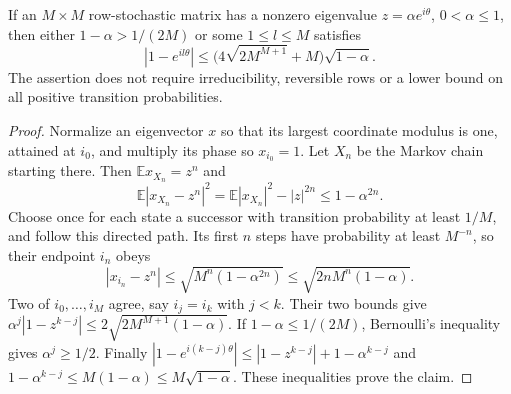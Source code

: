 \begin{lemma}\label{lem:r68-cycle}
If an $M\times M$ row-stochastic matrix has a nonzero eigenvalue $z=\alpha e^{i\theta}$, $0<\alpha\le1$, then either $1-\alpha>1/(2M)$ or some $1\le l\le M$ satisfies
\begin{equation}\label{eq:r68-cycle}
 |1-e^{il\theta}|\le
       \bigl(4\sqrt{2M^{M+1}}+M\bigr)\sqrt{1-\alpha}.
\end{equation}
The assertion does not require irreducibility, reversible rows or a lower bound on all positive transition probabilities.
\end{lemma}
\begin{proof}
Normalize an eigenvector $x$ so that its largest coordinate modulus is one, attained at $i_0$, and multiply its phase so $x_{i_0}=1$. Let $X_n$ be the Markov chain starting there. Then $\mathbb E x_{X_n}=z^n$ and
\[
 \mathbb E|x_{X_n}-z^n|^2
       =\mathbb E|x_{X_n}|^2-|z|^{2n}\le1-\alpha^{2n}.
\]
Choose once for each state a successor with transition probability at least $1/M$, and follow this directed path. Its first $n$ steps have probability at least $M^{-n}$, so their endpoint $i_n$ obeys
\[
 |x_{i_n}-z^n|\le\sqrt{M^n(1-\alpha^{2n})}
                \le\sqrt{2nM^n(1-\alpha)}.
\]
Two of $i_0,\ldots,i_M$ agree, say $i_j=i_k$ with $j<k$. Their two bounds give
$\alpha^j|1-z^{k-j}|\le2\sqrt{2M^{M+1}(1-\alpha)}$.
If $1-\alpha\le1/(2M)$, Bernoulli's inequality gives $\alpha^j\ge1/2$. Finally
$|1-e^{i(k-j)\theta}|\le|1-z^{k-j}|+1-\alpha^{k-j}$ and
$1-\alpha^{k-j}\le M(1-\alpha)\le M\sqrt{1-\alpha}$.
These inequalities prove the claim.
\end{proof}


